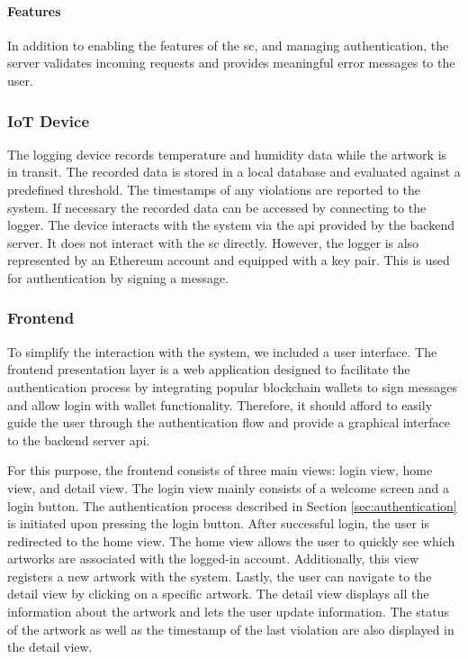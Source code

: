 \paragraph{Features}
In addition to enabling the features of the \gls{sc}, and managing authentication, the server validates incoming requests and provides meaningful error messages to the user.

\subsubsection{IoT Device}
The logging device records temperature and humidity data while the artwork is in transit. The recorded data is stored in a local database and evaluated against a predefined threshold. The timestamps of any violations are reported to the system. If necessary the recorded data can be accessed by connecting to the logger. The device interacts with the system via the \gls{api} provided by the backend server. It does not interact with the \gls{sc} directly. However, the logger is also represented by an Ethereum account and equipped with a key pair. This is used for authentication by signing a message.

\subsubsection{Frontend}
To simplify the interaction with the system, we included a user interface. The frontend presentation layer is a web application designed to facilitate the authentication process by integrating popular blockchain wallets to sign messages and allow login with wallet functionality. Therefore, it should afford to easily guide the user through the authentication flow and provide a graphical interface to the backend server \gls{api}.

For this purpose, the frontend consists of three main views: login view, home view, and detail view. The login view mainly consists of a welcome screen and a login button. The authentication process described in Section \ref{sec:authentication} is initiated upon pressing the login button. After successful login, the user is redirected to the home view. The home view allows the user to quickly see which artworks are associated with the logged-in account. Additionally, this view registers a new artwork with the system. Lastly, the user can navigate to the detail view by clicking on a specific artwork. The detail view displays all the information about the artwork and lets the user update information. The status of the artwork as well as the timestamp of the last violation are also displayed in the detail view.
